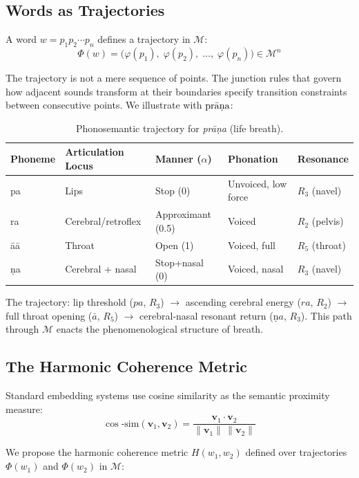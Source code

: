 \documentclass[12pt]{article}
\begin{document}
\subsection{Words as Trajectories}

A word $w = p_1 p_2 \cdots p_n$ defines a trajectory in $\mathcal{M}$:
\[
\Phi(w) = \bigl(\varphi(p_1),\; \varphi(p_2),\; \ldots,\; \varphi(p_n)\bigr) \in \mathcal{M}^n
\]

The trajectory is not a mere sequence of points. The junction rules that govern how adjacent sounds transform at their boundaries specify transition constraints between consecutive points. We illustrate with $\text{pr\={a}\d{n}a}$:

\begin{table}[htbp]
\centering
\renewcommand{\arraystretch}{1.3}
\begin{tabular}{lllll}
\toprule
\textbf{Phoneme} & \textbf{Articulation Locus} & \textbf{Manner ($\alpha$)} & \textbf{Phonation} & \textbf{Resonance} \\
\midrule
pa & Lips & Stop (0) & Unvoiced, low force & $R_3$ (navel) \\
ra & Cerebral/retroflex & Approximant (0.5) & Voiced & $R_2$ (pelvis) \\
\={a}\={a} & Throat & Open (1) & Voiced, full & $R_5$ (throat) \\
\d{n}a & Cerebral + nasal & Stop+nasal (0) & Voiced, nasal & $R_3$ (navel) \\
\bottomrule
\end{tabular}
\caption{Phonosemantic trajectory for \textit{pr\={a}\d{n}a} (life breath).}
\end{table}

The trajectory: lip threshold ($pa$, $R_3$) $\to$ ascending cerebral energy ($ra$, $R_2$) $\to$ full throat opening ($\bar{a}$, $R_5$) $\to$ cerebral-nasal resonant return (\d{n}$a$, $R_3$). This path through $\mathcal{M}$ enacts the phenomenological structure of breath.

\subsection{The Harmonic Coherence Metric}

Standard embedding systems use cosine similarity as the semantic proximity measure:
\[
\cos\text{-sim}(\mathbf{v}_1, \mathbf{v}_2) = \frac{\mathbf{v}_1 \cdot \mathbf{v}_2}{\|\mathbf{v}_1\|\,\|\mathbf{v}_2\|}
\]

We propose the harmonic coherence metric $H(w_1, w_2)$ defined over trajectories $\Phi(w_1)$ and $\Phi(w_2)$ in $\mathcal{M}$:
\end{document}
